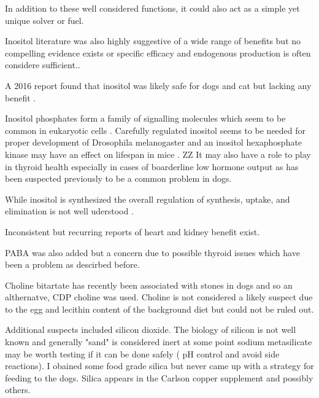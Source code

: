 In addition to these well considered functions, it could also act
as a simple yet unique solver or fuel. 

Inositol literature was also highly suggestive of a wide range of
benefits but no compelling evidence exists or specific efficacy
and endogenous production is often considere sufficient..

A 2016 report found that inositol was likely safe for
dogs and cat but lacking any benefit
\cite{https://doi.org/10.2903/j.efsa.2016.4511}.


Inositol phosphates form a family of  signalling
molecules which seem to be common in eukaryotic cells
\cite{Laha_PortelaTorres_Desfougeres_Inositol_phosphate_kinases_2021}
.
Carefully regulated inositol seems to be needed for
proper development of Drosophila melanogaster \cite{PMC8565467}
and an inositol hexaphosphate kinase may have an effect on
lifespan in mice \cite{Moritoh_Oka_Yasuhara_Inositol_Hexakisphosphate_Kinase_2016}.
ZZ
It may also have a role to play in thyroid health especially in 
cases of boarderline low hormone output 
\cite{PMC8143049} as has been suspected previously to be a common
problem in dogs. 

While inositol is synthesized the overall regulation of synthesis,
uptake, and elimination is not well uderstood
\cite{Su_Ko_Saiardi_Regulations_inositol_2023}.



Inconsistent but recurring reports of heart and kidney benefit
exist. 

PABA was also added but a concern due to possible thyroid issues which
have been a problem as descirbed before.

Choline bitartate has recently been associated with stones in dogs
and so an althernatve, CDP choline was used. Choline is not considered
a likely suspect due to the egg and lecithin content of the background
diet but could not be ruled out. 


Additional suspects included silicon dioxide. The biology of silicon
is not well known and generally "sand" is considered inert
at some point sodium metasilicate may be worth testing if it can
be done safely ( pH control and avoid side reactions). 
I obained some food grade silica but never came up with a strategy
for feeding to the dogs. 
Silica appears in the Carlson copper supplement and possibly others.


